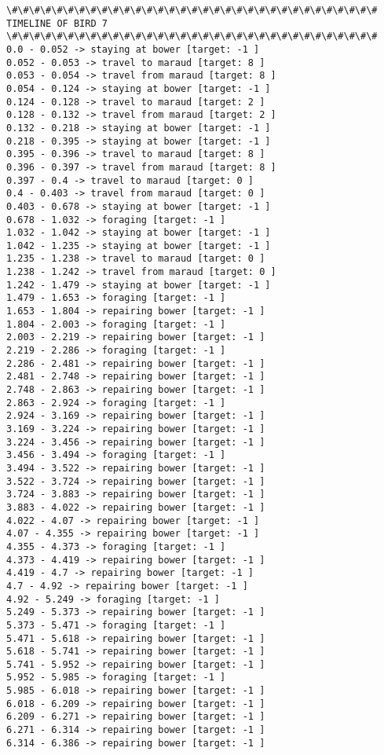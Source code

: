 \documentclass[11pt]{article}
\begin{document}
\begin{Verbatim}[commandchars=\\\{\}]
\#\#\#\#\#\#\#\#\#\#\#\#\#\#\#\#\#\#\#\#\#\#\#\#\#\#\#\#\#\#\#\#\#
TIMELINE OF BIRD 7
\#\#\#\#\#\#\#\#\#\#\#\#\#\#\#\#\#\#\#\#\#\#\#\#\#\#\#\#\#\#\#\#\#
0.0 - 0.052 -> staying at bower [target: -1 ]
0.052 - 0.053 -> travel to maraud [target: 8 ]
0.053 - 0.054 -> travel from maraud [target: 8 ]
0.054 - 0.124 -> staying at bower [target: -1 ]
0.124 - 0.128 -> travel to maraud [target: 2 ]
0.128 - 0.132 -> travel from maraud [target: 2 ]
0.132 - 0.218 -> staying at bower [target: -1 ]
0.218 - 0.395 -> staying at bower [target: -1 ]
0.395 - 0.396 -> travel to maraud [target: 8 ]
0.396 - 0.397 -> travel from maraud [target: 8 ]
0.397 - 0.4 -> travel to maraud [target: 0 ]
0.4 - 0.403 -> travel from maraud [target: 0 ]
0.403 - 0.678 -> staying at bower [target: -1 ]
0.678 - 1.032 -> foraging [target: -1 ]
1.032 - 1.042 -> staying at bower [target: -1 ]
1.042 - 1.235 -> staying at bower [target: -1 ]
1.235 - 1.238 -> travel to maraud [target: 0 ]
1.238 - 1.242 -> travel from maraud [target: 0 ]
1.242 - 1.479 -> staying at bower [target: -1 ]
1.479 - 1.653 -> foraging [target: -1 ]
1.653 - 1.804 -> repairing bower [target: -1 ]
1.804 - 2.003 -> foraging [target: -1 ]
2.003 - 2.219 -> repairing bower [target: -1 ]
2.219 - 2.286 -> foraging [target: -1 ]
2.286 - 2.481 -> repairing bower [target: -1 ]
2.481 - 2.748 -> repairing bower [target: -1 ]
2.748 - 2.863 -> repairing bower [target: -1 ]
2.863 - 2.924 -> foraging [target: -1 ]
2.924 - 3.169 -> repairing bower [target: -1 ]
3.169 - 3.224 -> repairing bower [target: -1 ]
3.224 - 3.456 -> repairing bower [target: -1 ]
3.456 - 3.494 -> foraging [target: -1 ]
3.494 - 3.522 -> repairing bower [target: -1 ]
3.522 - 3.724 -> repairing bower [target: -1 ]
3.724 - 3.883 -> repairing bower [target: -1 ]
3.883 - 4.022 -> repairing bower [target: -1 ]
4.022 - 4.07 -> repairing bower [target: -1 ]
4.07 - 4.355 -> repairing bower [target: -1 ]
4.355 - 4.373 -> foraging [target: -1 ]
4.373 - 4.419 -> repairing bower [target: -1 ]
4.419 - 4.7 -> repairing bower [target: -1 ]
4.7 - 4.92 -> repairing bower [target: -1 ]
4.92 - 5.249 -> foraging [target: -1 ]
5.249 - 5.373 -> repairing bower [target: -1 ]
5.373 - 5.471 -> foraging [target: -1 ]
5.471 - 5.618 -> repairing bower [target: -1 ]
5.618 - 5.741 -> repairing bower [target: -1 ]
5.741 - 5.952 -> repairing bower [target: -1 ]
5.952 - 5.985 -> foraging [target: -1 ]
5.985 - 6.018 -> repairing bower [target: -1 ]
6.018 - 6.209 -> repairing bower [target: -1 ]
6.209 - 6.271 -> repairing bower [target: -1 ]
6.271 - 6.314 -> repairing bower [target: -1 ]
6.314 - 6.386 -> repairing bower [target: -1 ]

\end{Verbatim}
\end{document}
